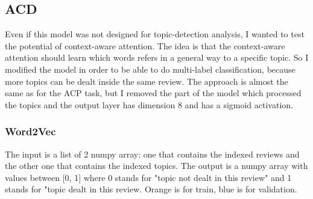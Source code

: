 \documentclass{article}
\begin{document}
        \subsection{ACD}\label{subsec:s2}
            Even if this model was not designed for topic-detection analysis, I wanted to test the potential of context-aware attention.
            The idea is that the context-aware attention should learn which words refers in a general way to a specific topic.
            So I modified the model in order to be able to do multi-label classification, because more topics can be dealt inside the same review.
            The approach is almost the same as for the ACP task, but I removed the part of the model which processed the topics and the output layer has dimension 8 and has a sigmoid activation.

            \subsubsection{Word2Vec}
                The input is a list of 2 numpy array: one that contains the indexed reviews and the other one that contains the indexed topics.
                The output is a numpy array with values between [0, 1] where 0 stands for "topic not dealt in this review" and 1 stands for "topic dealt in this review.
                \color{orange} Orange is for train, \color{blue} blue is for validation.\color{black}
\end{document}
